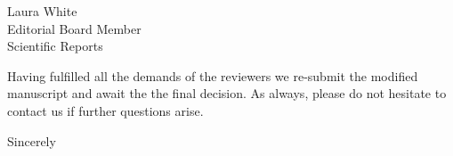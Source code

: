 \documentclass[a4paper,10pt]{letter}
\begin{document}
\begin{letter}{Laura White\\Editorial Board Member\\Scientific Reports }
\begin{description}
\end{description}

Having fulfilled all the demands of the reviewers we re-submit the modified 
manuscript and await the the final decision. As always, please do not hesitate 
to contact us if further questions arise.


\signature{Flávio Codeço Coelho\\Professor}

\closing{Sincerely}


\end{letter}
\end{document}
